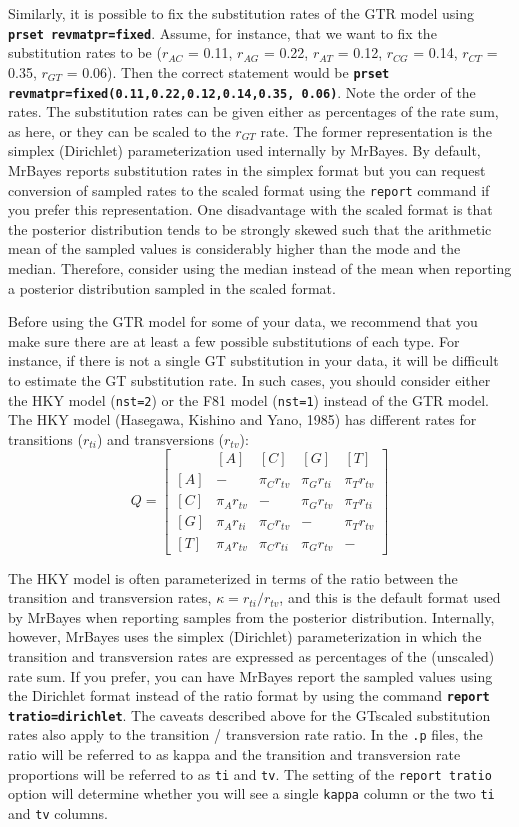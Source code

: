 \documentclass[12pt]{book}
\newcommand{\ttt}[1]{\texttt{#1}}
\newcommand{\tb}[1]{\ttt{\textbf{#1}}}
\begin{document}
Similarly, it is possible to fix the substitution rates of the GTR model using \tb{prset
revmatpr=fixed}. Assume, for instance, that we want to fix the substitution rates to be ($r_{AC}$ =
0.11, $r_{AG}$ = 0.22, $r_{AT}$ = 0.12, $r_{CG}$ = 0.14, $r_{CT}$ = 0.35, $r_{GT}$ = 0.06). Then
the correct statement would be \tb{prset revmatpr=fixed(0.11,0.22,0.12,0.14,0.35, 0.06)}. Note the
order of the rates. The substitution rates can be given either as percentages of the rate sum, as
here, or they can be scaled to the $r_{GT}$ rate. The former representation is the simplex
(Dirichlet) parameterization used internally by MrBayes. By default, MrBayes reports substitution
rates in the simplex format but you can request conversion of sampled rates to the scaled format
using the \ttt{report} command if you prefer this representation. One disadvantage with the scaled
format is that the posterior distribution tends to be strongly skewed such that the arithmetic mean
of the sampled values is considerably higher than the mode and the median. Therefore, consider
using the median instead of the mean when reporting a posterior distribution sampled in the scaled
format.

Before using the GTR model for some of your data, we recommend that you make sure there are at
least a few possible substitutions of each type. For instance, if there is not a single GT
substitution in your data, it will be difficult to estimate the GT substitution rate. In such
cases, you should consider either the HKY model (\ttt{nst=2}) or the F81 model (\ttt{nst=1})
instead of the GTR model. The HKY model (Hasegawa, Kishino and Yano, 1985) has different rates for
transitions ($r_{ti}$) and transversions ($r_{tv}$): \[ Q=\begin{bmatrix} & [A] & [C] & [G] & [T]
    \\ [A]& - & \pi_C r_{tv} & \pi_G r_{ti} & \pi_T r_{tv}\\ [C]& \pi_A r_{tv} & - & \pi_G r_{tv}
&\pi_T r_{ti} \\ [G]& \pi_A r_{ti} & \pi_C r_{tv}& - & \pi_T r_{tv}\\ [T]& \pi_A r_{tv} & \pi_C
r_{ti}&\pi_G r_{tv}  & - \end{bmatrix} \]

The HKY model is often parameterized in terms of the ratio between the transition and transversion
rates, $\kappa = r_{ti}/r_{tv}$, and this is the default format used by MrBayes when reporting
samples from the posterior distribution. Internally, however, MrBayes uses the simplex (Dirichlet)
parameterization in which the transition and transversion rates are expressed as percentages of the
(unscaled) rate sum. If you prefer, you can have MrBayes report the sampled values using the
Dirichlet format instead of the ratio format by using the command \tb{report tratio=dirichlet}. The
caveats described above for the GTscaled substitution rates also apply to the transition /
transversion rate ratio. In the \ttt{.p} files, the ratio will be referred to as kappa and the
transition and transversion rate proportions will be referred to as \ttt{ti} and \ttt{tv}. The
setting of the \ttt{report tratio} option will determine whether you will see a single \ttt{kappa}
column or the two \ttt{ti} and \ttt{tv} columns.
\end{document}
